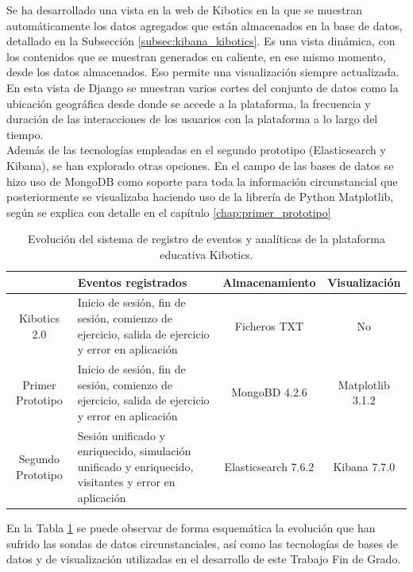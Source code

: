 \documentclass[a4paper, 12pt]{book}
\begin{document}
		Se ha desarrollado una vista en la web de Kibotics en la que se muestran automáticamente los datos agregados que están almacenados en la base de datos, detallado en la Subsección \ref{subsec:kibana_kibotics}. Es una vista dinámica, con los contenidos que se muestran generados en caliente, en ese mismo momento, desde los datos almacenados. Eso permite una visualización siempre actualizada. En esta vista de Django se muestran varios cortes del conjunto de datos como la ubicación geográfica desde donde se accede a la plataforma, la frecuencia y duración de las interacciones de los usuarios con la plataforma a lo largo del tiempo. \\
	
		Además de las tecnologías empleadas en el segundo prototipo (Elasticsearch y Kibana), se han explorado otras opciones. En el campo de las bases de datos se hizo uso de MongoDB como soporte para toda la información circunstancial que posteriormente se visualizaba haciendo uso de la librería de Python Matplotlib, según se explica con detalle en el capítulo \ref{chap:primer_prototipo} \\

		
		\begin{table}[H]
			\begin{center}
				\begin{tabular}{ | c | p{6cm} | c | c |} 
					\hline
				 & Eventos registrados & Almacenamiento & Visualización \\ 
					\hline 
					Kibotics 2.0 & Inicio de sesión, fin de sesión, comienzo de ejercicio, salida de ejercicio y error en aplicación & Ficheros TXT & No\\ 
					\hline
					Primer Prototipo & Inicio de sesión, fin de sesión, comienzo de ejercicio, salida de ejercicio y error en aplicación& MongoBD 4.2.6 & Matplotlib 3.1.2\\ 
					\hline
					Segundo Prototipo & Sesión unificado y enriquecido, simulación  unificado y enriquecido, visitantes y error en aplicación & Elasticsearch 7.6.2 & Kibana 7.7.0\\ 
					\hline

				\end{tabular}
				\label{tabla:evolucion_analiticas}
				\caption{Evolución del sistema de registro de eventos y analíticas de la plataforma educativa Kibotics.}
			\end{center}
		\end{table}
	
				
		En la Tabla \ref{tabla:evolucion_analiticas} se puede observar de forma esquemática la evolución que han sufrido las sondas de datos circunstanciales, así como las tecnologías de bases de datos y de visualización utilizadas en el desarrollo de este Trabajo Fin de Grado.
\end{document}
